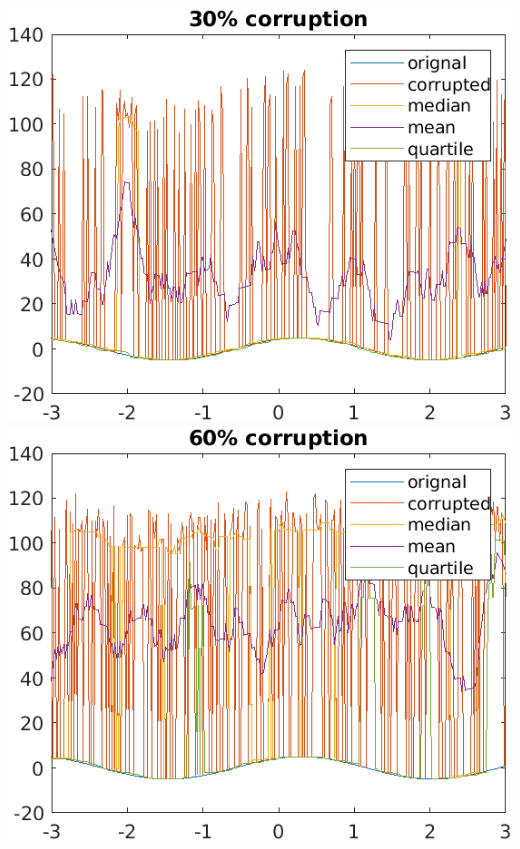 \documentclass{article}
\theoremstyle{remark}
\begin{document}
\begin{center}
    \includegraphics{q6(1).png}
    \includegraphics{q6(2).png}
\end{center}
\end{document}
